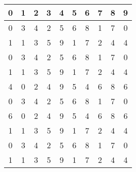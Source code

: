 \documentclass[11pt,a4paper]{book}
\begin{document}
\begin{itemize}
\begin{tabular}{|c|c|c|c|c|c|c|c|c|c|}
		\hline
		0& 1& 2& 3&4 &5 &6 &7 &8 &9\\
		\hline
		0& 3&4 &2 &5 &6 &8 &1 &7 &0 \\
		\hline
		1&1&3 &5 &9 &1 &7 &2 &4 &4\\
		\hline
		0& 3&4 &2 &5 &6 &8 &1 &7 &0 \\
		\hline
		1&1&3 &5 &9 &1 &7 &2 &4 &4\\
		\hline
		4&0&2 &4 &9 &5 &4 &6 &8 &6 \\
		\hline
		0& 3&4 &2 &5 &6 &8 &1 &7 &0 \\
		\hline
		6& 0&2 &4 &9 &5 &4 &6 &8 &6 \\
		\hline
		1&1&3 &5 &9 &1 &7 &2 &4 &4\\
		\hline
		0& 3&4 &2 &5 &6 &8 &1 &7 &0 \\
		\hline		
		1&1&3 &5 &9 &1 &7 &2 &4 &4\\
		\hline
		\end{tabular}
	\end{itemize}
\end{document}

